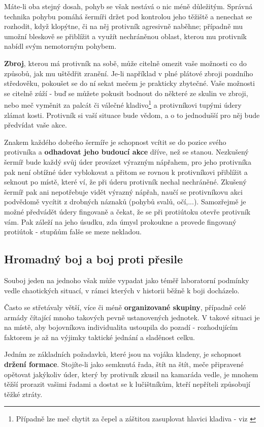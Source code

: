 Máte-li oba stejný dosah, pohyb se však nestává o nic méně důležitým. Správná technika pohybu pomáhá šermíři držet pod kontrolou jeho těžiště a nenechat se rozhodit, když klopýtne, či na něj protivník agresivně naběhne; případně mu umožní bleskově se přiblížit a využít nechráněnou oblast, kterou mu protivník nabídl svým nemotorným pohybem. 

\textbf{Zbroj}, kterou má protivník na sobě, může citelně omezit vaše možnosti co do způsobů, jak mu uštědřit zranění. Je-li například v plné plátové zbroji pozdního středověku, pokoušet se do ní sekat mečem je prakticky zbytečné. Vaše možnosti se citelně zúží - buď se můžete pokusit bodnout do některé ze skulin ve zbroji, nebo meč vyměnit za palcát či válečné kladivo\footnote{Případně lze meč chytit za čepel a záštitou zasuplovat hlavici kladiva - viz \cite{FightingWithTheGermanLongsword}} a protivníkovi tupými údery zlámat kosti. Protivník si vaší situace bude vědom, a o to jednodušší pro něj bude předvídat vaše akce.

Znakem každého dobrého šermíře je schopnost vcítit se do pozice svého protivníka a \textbf{odhadovat jeho budoucí akce} dříve, než se stanou. Nezkušený šermíř bude každý svůj úder provázet výrazným nápřahem, pro jeho protivníka pak není obtížné úder vyblokovat a přitom se rovnou k protivníkovi přiblížit a seknout po místě, které ví, že při úderu protivník nechal nechráněné. Zkušený šermíř pak ani nepotřebuje vidět výrazný nápřah, naučí se protivníkovu akci podvědomě vycítit z drobných náznaků (pohybů svalů, očí,...). Samozřejmě je možné předvádět údery fingovaně a čekat, že se při protiútoku otevře protivník vám. Pak záleží na jeho úsudku, zda úmysl prokoukne a provede fingovaný protiútok - stupňům falše se meze nekladou. 

\subsection{Hromadný boj a boj proti přesile}
Souboj jeden na jednoho však může vypadat jako téměř laboratorní podmínky vedle chaotických situací, v rámci kterých v historii běžně k boji docházelo.   

Často se střetávaly větší, více či méně \textbf{organizované skupiny}, případně celé armády čítající mnoho takových pevně ustanovených jednotek. V takové situaci je na místě, aby bojovníkova individualita ustoupila do pozadí - rozhodujícím faktorem je až na výjimky taktické jednání a sladěnost celku. 

Jedním ze základních požadavků, které jsou na vojáka kladeny, je schopnost \textbf{držení formace}. Stojíte-li jako semknutá řada, štít na štít, meče připravené opětovat jakýkoliv úder, který by protivník zkusil na kamaráda vedle, je mnohem těžší prorazit vašimi řadami a dostat se k lučištníkům, kteří nepříteli způsobují těžké ztráty. 

